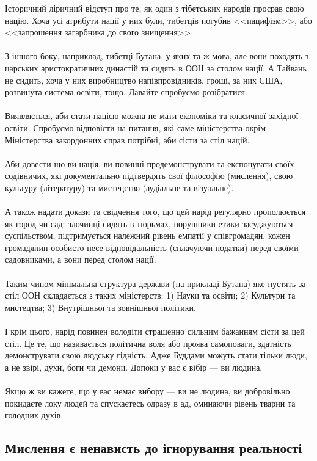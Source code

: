 Історичний ліричний відступ про те, як один з тібетських народів просрав свою націю.
Хоча усі атрибути нації у них були, тибетців погубив <<пацифізм>>,
або <<запрошення загарбника до свого знищення>>.
\\
\\
З іншого боку, наприклад, тибетці Бутана, у яких та ж мова, але вони походять
з царських аристократичних династій та сидять в ООН за столом нації. А Тайвань не сидить,
хоча у них виробництво напівпровідників, гроші, за них США, розвинута система освіти, тощо.
Давайте спробуємо розібратися.
\\
\\
Виявляється, аби стати нацією можна не мати економіки та класичної західної освіти.
Спробуємо відповісти на питання, які саме міністерства окрім Міністерства закордонних справ потрібні,
аби сісти за стіл націй.
\\
\\
Аби довести що ви нація, ви повинні продемонструвати та експонувати своїх содівничих,
які документально підтвердять свої філософію (мислення), свою культуру (літературу)
та мистецство (аудіальне та візуальне).
\\
\\
А також надати докази та свідчення того, що цей нарід регулярно прополюється як город чи сад:
злочинці сидять в тюрьмах, порушники етики засуджуються суспільством, підтримується належний
рівень емпатії у співгромадян, кожен громадянин особисто несе відповідальність (сплачуючи податки)
перед своїми садовниками, а вони перед столом нації.
\\
\\
Таким чином мінімальна структура держави (на прикладі Бутана) яке пустять за стіл ООН
складається з таких міністерств: 1) Науки та освіти; 2) Культури та мистецтва; 3) Внутрішньої та зовнішньої
політики.
\\
\\
І крім цього, нарід повинен володіти страшенно сильним бажанням сісти за цей стіл.
Це те, що називається політична воля або проява самоповаги, здатність демонструвати свою
людську гідність. Адже Буддами можуть стати тільки люди, а не звірі, духи, боги чи демони.
Допоки у вас є вібір --- ви людина.
\\
\\
Якщо ж ви кажете, що у вас немає вибору --- ви не людина, ви добровільно покидаєте локу людей
та спускаєтесь одразу в ад, оминаючи рівень тварин та голодних духів.

\subsection{Мислення є ненависть до ігнорування реальності}

